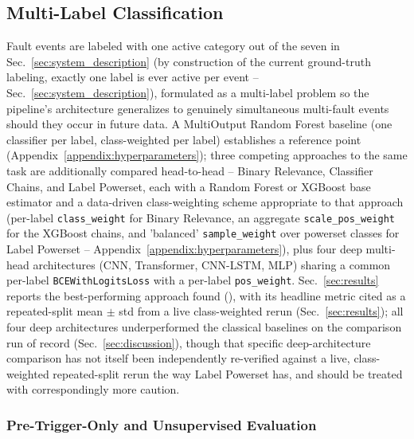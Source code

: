 \subsection{Multi-Label Classification}
\label{sec:multilabel_classification}

Fault events are labeled with one active category out of the seven in Sec.~\ref{sec:system_description} (by construction of the current ground-truth labeling, exactly one label is ever active per event -- Sec.~\ref{sec:system_description}), formulated as a multi-label problem so the pipeline's architecture generalizes to genuinely simultaneous multi-fault events should they occur in future data. A MultiOutput Random Forest baseline (one classifier per label, class-weighted per label) establishes a reference point (Appendix~\ref{appendix:hyperparameters}); three competing approaches to the same task are additionally compared head-to-head -- Binary Relevance, Classifier Chains, and Label Powerset, each with a Random Forest or XGBoost base estimator and a data-driven class-weighting scheme appropriate to that approach (per-label \texttt{class\_weight} for Binary Relevance, an aggregate \texttt{scale\_pos\_weight} for the XGBoost chains, and 'balanced' \texttt{sample\_weight} over powerset classes for Label Powerset -- Appendix~\ref{appendix:hyperparameters}), plus four deep multi-head architectures (CNN, Transformer, CNN-LSTM, MLP) sharing a common per-label \texttt{BCEWithLogitsLoss} with a per-label \texttt{pos\_weight}. Sec.~\ref{sec:results} reports the best-performing approach found (\MetricZeroSevenMultilabelPhaseABCDBestApproach{}), with its headline metric cited as a repeated-split mean $\pm$ std from a live class-weighted rerun (Sec.~\ref{sec:results}); all four deep architectures underperformed the classical baselines on the comparison run of record (Sec.~\ref{sec:discussion}), though that specific deep-architecture comparison has not itself been independently re-verified against a live, class-weighted repeated-split rerun the way Label Powerset has, and should be treated with correspondingly more caution. %

\subsubsection{Pre-Trigger-Only and Unsupervised Evaluation}
\label{sec:multilabel_2x2}

